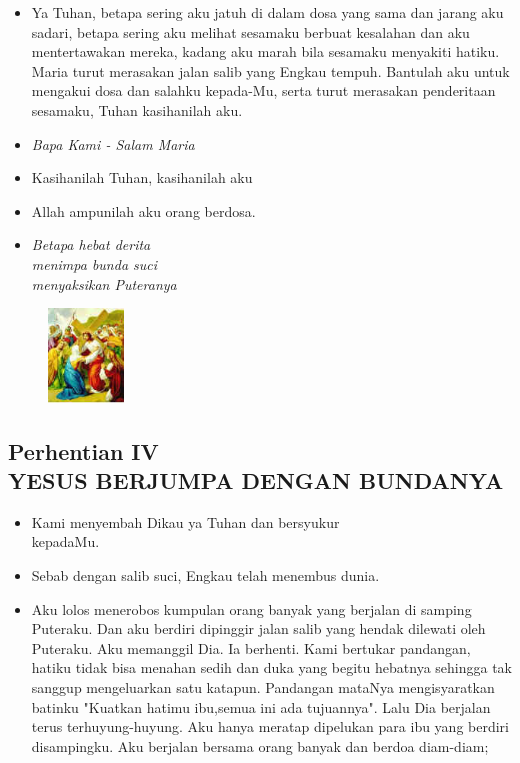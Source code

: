 \documentclass[a5paper,headsepline,titlepage,10pt,nnormalheadings,DIVcalc]{scrbook}
\newcommand{\BU}[1]{\begin{itemize} \item[U:] #1 \end{itemize}}
\newcommand{\BP}[1]{\begin{itemize} \item[P:] #1 \end{itemize}}
\begin{document}
\BU{ Ya Tuhan, betapa sering aku jatuh di dalam dosa yang sama dan jarang aku sadari, betapa sering aku melihat sesamaku berbuat kesalahan dan aku mentertawakan mereka, kadang aku marah bila sesamaku menyakiti hatiku. Maria turut merasakan jalan salib yang Engkau tempuh. Bantulah aku untuk mengakui dosa dan salahku kepada-Mu, serta turut merasakan penderitaan sesamaku, Tuhan kasihanilah aku.}

\large\begin{itemize}\item[~]\it{Bapa Kami - Salam Maria}\end{itemize}\normalsize
\BP{Kasihanilah Tuhan, kasihanilah aku}
\BU{Allah ampunilah aku orang berdosa.}

\begin{itemize}
\item[3.] \it{Betapa hebat derita\\ menimpa bunda suci\\
   menyaksikan Puteranya}
\end{itemize}

\begin{figure}
\includegraphics[width=2cm]{jalansalib_files/04_small.jpg}
\end{figure}
\subsection*{Perhentian IV\\
YESUS BERJUMPA DENGAN BUNDANYA}

\BP{ Kami menyembah Dikau ya Tuhan dan bersyukur\\kepadaMu.}
\BU{ Sebab dengan salib suci, Engkau telah menembus dunia.}

\BP{ Aku lolos menerobos kumpulan orang banyak yang berjalan di samping Puteraku. Dan aku berdiri dipinggir jalan salib yang hendak dilewati oleh Puteraku. Aku memanggil Dia. Ia berhenti. Kami bertukar pandangan, hatiku tidak bisa menahan sedih dan duka yang begitu hebatnya sehingga tak sanggup mengeluarkan satu katapun. Pandangan mataNya mengisyaratkan batinku "Kuatkan hatimu ibu,semua ini ada tujuannya". Lalu Dia berjalan terus terhuyung-huyung. Aku hanya meratap dipelukan para ibu yang berdiri disampingku. Aku berjalan bersama orang banyak dan berdoa diam-diam;}
\end{document}
